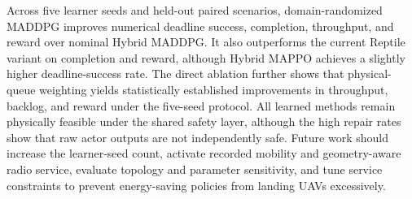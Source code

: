 \documentclass[journal]{IEEEtran}
\begin{document}
Across five learner seeds and held-out paired scenarios, domain-randomized
MADDPG improves numerical deadline success, completion, throughput, and reward
over nominal Hybrid MADDPG. It also outperforms the current Reptile variant on
completion and reward, although Hybrid MAPPO achieves a slightly higher
deadline-success rate. The direct ablation further shows that physical-queue
weighting yields statistically established improvements in throughput,
backlog, and reward under the five-seed protocol. All learned methods remain physically feasible under
the shared safety layer, although the high repair rates show that raw actor
outputs are not independently safe. Future work should increase the
learner-seed count, activate recorded mobility and geometry-aware radio
service, evaluate topology and parameter sensitivity, and tune service
constraints to prevent energy-saving policies from landing UAVs excessively.
\end{document}
